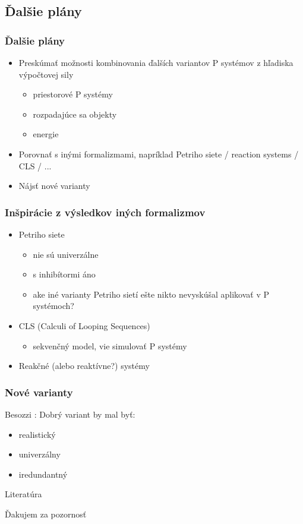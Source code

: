 
\subsection{Ďalšie plány} %
\label{sub:dalsie_plany}

\begin{frame}[t]\frametitle{Ďalšie plány}
\begin{itemize}
  \item Preskúmať možnosti kombinovania ďalších variantov P systémov z hľadiska výpočtovej sily
  \begin{itemize}
    \item priestorové P systémy
    \item rozpadajúce sa objekty
    \item energie
  \end{itemize}
  \item Porovnať s inými formalizmami, napríklad Petriho siete / reaction systems / CLS / ...
  \item Nájsť nové varianty
\end{itemize}
\end{frame}
\note{}


\begin{frame}[t]\frametitle{Inšpirácie z výsledkov iných formalizmov}
\begin{itemize}
  \item Petriho siete
  \begin{itemize}
    \item nie sú univerzálne
    \item s inhibítormi áno
    \item ake iné varianty Petriho sietí ešte nikto nevyskúšal aplikovať v P systémoch?
  \end{itemize}
  \item CLS (Calculi of Looping Sequences)
  \begin{itemize}
    \item sekvenčný model, vie simulovať P systémy \cite{Barbuti07CLS}
  \end{itemize}
  \item Reakčné (alebo reaktívne?) systémy
\end{itemize}
\end{frame}
\note{}

\begin{frame}[t]\frametitle{Nové varianty}
Besozzi \cite{Besozzi:PhD:2004}: Dobrý variant by mal byť:
\begin{itemize}
  \item realistický
  \item univerzálny
  \item iredundantný
\end{itemize}
\end{frame}
\note{}



\begin{frame}[allowframebreaks]{Literatúra}


\end{frame}

\begin{frame}[plain]
\begin{center}
  Ďakujem za pozornosť
\end{center}
\end{frame}

